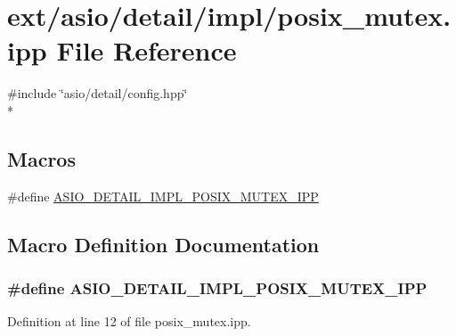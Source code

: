 \hypertarget{posix__mutex_8ipp}{}\section{ext/asio/detail/impl/posix\+\_\+mutex.ipp File Reference}
\label{posix__mutex_8ipp}
{\ttfamily \#include \char`\"{}asio/detail/config.\+hpp\char`\"{}}\\*
\subsection*{Macros}
\begin{DoxyCompactItemize}
\item 
\#define \hyperlink{posix__mutex_8ipp_a6db3409018ba4b978cb8c1aeed30a25b}{A\+S\+I\+O\+\_\+\+D\+E\+T\+A\+I\+L\+\_\+\+I\+M\+P\+L\+\_\+\+P\+O\+S\+I\+X\+\_\+\+M\+U\+T\+E\+X\+\_\+\+I\+P\+P}
\end{DoxyCompactItemize}


\subsection{Macro Definition Documentation}
\hypertarget{posix__mutex_8ipp_a6db3409018ba4b978cb8c1aeed30a25b}{}
\subsubsection[{A\+S\+I\+O\+\_\+\+D\+E\+T\+A\+I\+L\+\_\+\+I\+M\+P\+L\+\_\+\+P\+O\+S\+I\+X\+\_\+\+M\+U\+T\+E\+X\+\_\+\+I\+P\+P}]{\setlength{\rightskip}{0pt plus 5cm}\#define A\+S\+I\+O\+\_\+\+D\+E\+T\+A\+I\+L\+\_\+\+I\+M\+P\+L\+\_\+\+P\+O\+S\+I\+X\+\_\+\+M\+U\+T\+E\+X\+\_\+\+I\+P\+P}\label{posix__mutex_8ipp_a6db3409018ba4b978cb8c1aeed30a25b}


Definition at line 12 of file posix\+\_\+mutex.\+ipp.

